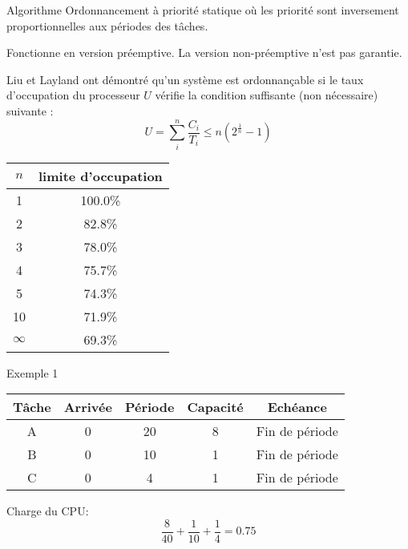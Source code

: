 \begin{frame}{Algorithme}
  Ordonnancement à priorité statique où les priorité sont inversement
  proportionnelles aux périodes des tâches. 

  Fonctionne  en version préemptive.  La version  non-préemptive n'est
  pas garantie.

  Liu et Layland ont démontré qu'un système est ordonnançable si le
  taux d'occupation du processeur $U$ vérifie la condition suffisante
  (non nécessaire) suivante :
  $$U = \sum_i^n \frac{C_i}{T_i} \leq n \left(2^{\frac{1}{n}}-1\right)$$

  \begin{center}
    \begin{tabular}{cc}
      \hline
      $n$ & limite d'occupation \\
      \hline
      1 & 100.0\% \\
      2 & 82.8\% \\
      3 & 78.0\% \\
      4 & 75.7\% \\
      5 & 74.3\% \\
      10 & 71.9\% \\
      $\infty$ & 69.3\%\\
      \hline
    \end{tabular}
  \end{center}
\end{frame}

\begin{frame}{Exemple 1}
  \begin{center}
    \begin{tabular}{ccccc}
      \hline
      Tâche & Arrivée & Période & Capacité & Echéance \\
      \hline
      A & 0 & 20 & 8 & Fin de période\\
      B & 0 & 10 & 1 & Fin de période\\
      C & 0 &  4 & 1 & Fin de période\\
      \hline
    \end{tabular}
  \end{center}
  Charge du CPU:
  $$\frac{8}{40} + \frac{1}{10} + \frac{1}{4} = 0.75$$
\end{frame} 

